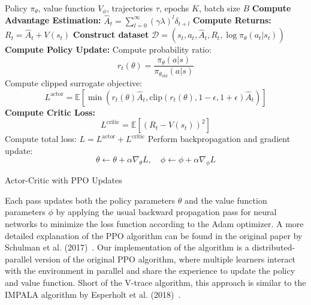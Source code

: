 \begin{algorithm}[H]
    \begin{algorithmic}[1]
        \Require Policy $\pi_\theta$, value function $V_\phi$, trajectories $\tau$, epochs $K$, batch size $B$
        \State \textbf{Compute Advantage Estimation:}
        \State $\hat{A}_t = \sum_{l=0}^{\infty} (\gamma \lambda)^l \delta_{t+l}$
        \State \textbf{Compute Returns:} $R_t = \hat{A}_t + V(s_t)$
        \State \textbf{Construct dataset} $\mathcal{D} = (s_t, a_t, \hat{A}_t, R_t, \log \pi_\theta(a_t | s_t))$
                \State \textbf{Compute Policy Update:}
                \State Compute probability ratio:
                \[
                    r_t(\theta) = \frac{\pi_\theta(a | s)}{\pi_{\theta_{\text{old}}}(a | s)}
                \]
                \State Compute clipped surrogate objective:
                \[
                    L^{\text{actor}} = \mathbb{E} \left[ \min(r_t(\theta) \hat{A}_t, \text{clip}(r_t(\theta), 1 - \epsilon, 1 + \epsilon) \hat{A}_t) \right]
                \]
                \State \textbf{Compute Critic Loss:}
                \[
                    L^{\text{critic}} = \mathbb{E} \left[ (R_t - V(s_t))^2 \right]
                \]
                \State Compute total loss: $L = L^{\text{actor}} + L^{\text{critic}}$
                \State Perform backpropagation and gradient update:
                \[
                    \theta \gets \theta + \alpha \nabla_\theta L, \quad \phi \gets \phi + \alpha \nabla_\phi L
                \]
            \EndFor
        \EndFor
    \end{algorithmic}
    \caption{Actor-Critic with PPO Updates}
    \label{alg:ppo}
\end{algorithm}

Each pass updates both the policy parameters $\theta$ and the value function parameters $\phi$
by applying the usual backward propagation pass for neural networks to minimize the loss function according to the Adam optimizer.
A more detailed explanation of the PPO algorithm can be found in the original paper by Schulman et al. (2017)~\cite{Schulman2017}.
Our implementation of the algorithm is a distributed-parallel version of the original PPO algorithm,
where multiple learners interact with the environment in parallel and share the experience to update the policy and value function.
Short of the V-trace algorithm, this approach is similar to the IMPALA algorithm by Esperholt et al. (2018)~\cite{Espeholt2018}.

